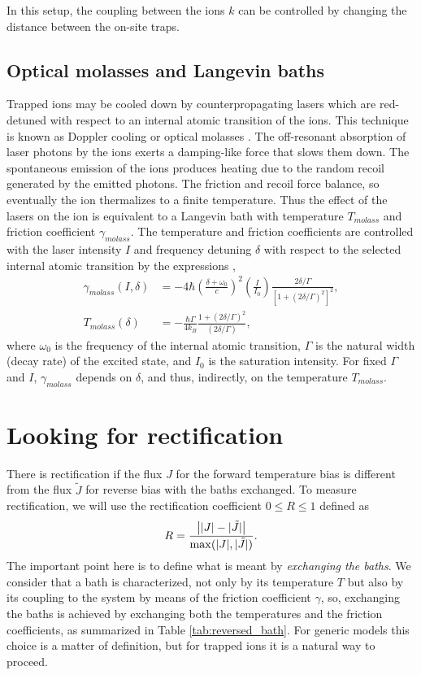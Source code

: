 %
In this setup, the coupling between the ions $k$ can be controlled by changing the distance between the on-site traps.
%
%
%
\subsection{Optical molasses and Langevin baths}
%
%
%
Trapped ions may be cooled down by counterpropagating lasers which are red-detuned with respect to an internal atomic transition of the ions. This technique is known as Doppler cooling or optical molasses \cite{Chu1985,Cohen1992,Metcalf1999,Metcalf2003}. The off-resonant absorption of laser photons by the ions exerts a damping-like force that slows them down. The spontaneous emission of the ions produces heating due to the random recoil generated by the emitted photons. The friction and recoil force balance, so eventually the ion thermalizes to a finite temperature.
Thus the effect of the lasers on the ion is equivalent to a Langevin bath with temperature $T_{molass}$ and friction coefficient $\gamma_{molass}$. The temperature and friction coefficients are controlled with the laser intensity $I$ and frequency detuning $\delta$ with respect to the selected internal atomic transition by the expressions \cite{Cohen1992,Metcalf2003,Ruiz2014},
%
\begin{align}
  \gamma_{molass}(I,\delta) &= -4 \hbar \left(\frac{\delta + \omega_0}{c}\right)^2 \left(\frac{I}{I_0}\right)\frac{2\delta/\Gamma}{\left[1 + (2\delta/\Gamma)^2\right]^2},\nonumber\\
  T_{molass}(\delta) &= -\frac{\hbar \Gamma}{4 k_B} \frac{1+(2\delta/\Gamma)^2}{(2\delta/\Gamma)},
  \label{eq:DopplerCoolingToyModel}
\end{align}
%
where $\omega_0$ is the frequency of the internal atomic transition, $\Gamma$ is the natural width (decay rate) of the excited state, and $I_0$ is the saturation intensity. For fixed $\Gamma$ and $I$, $\gamma_{molass}$ depends on $\delta$, and thus, indirectly, on the temperature $T_{molass}$.
%
%
%
\section{Looking for rectification\label{sec:lookingForR}}
%
%
%
There is rectification if the flux $J$  for the forward temperature bias is different from the flux $\tilde{J}$ for reverse bias
with the baths exchanged.  To measure rectification, we will use the rectification coefficient $0\le R\le 1$ defined as
%
\begin{equation}
  R = \frac{\abs{|J|-|\tilde{J}|}}{\max(|J|,|\tilde{J}|)}.
  \label{eq:Rectification}
\end{equation}
%
The important point here is to define what is  meant by \textit{exchanging the baths}. We consider that a bath is characterized, not only by its temperature $T$ but also by its coupling  to the system by means of the friction coefficient $\gamma$, so, exchanging the baths is achieved by exchanging both the temperatures and the friction coefficients, as summarized in Table \ref{tab:reversed_bath}. For generic models this
choice is a matter of definition, but for trapped ions it is a natural way to proceed.

